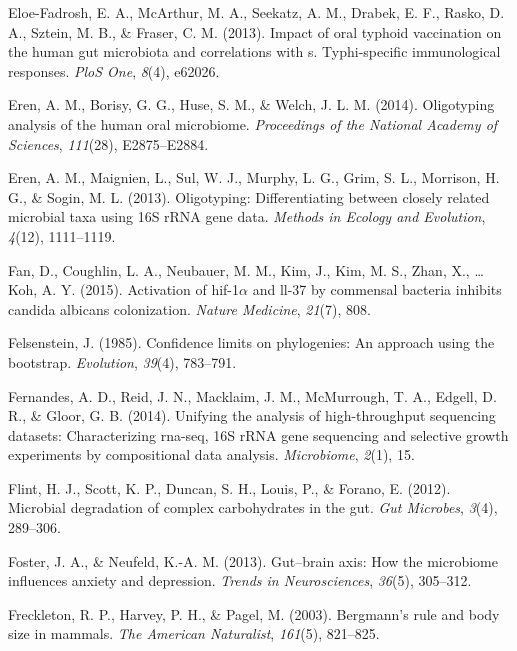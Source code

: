 \documentclass[12pt,a4paper]{reedthesis}
\theoremstyle{definition}
\theoremstyle{definition}
\theoremstyle{definition}
\theoremstyle{remark}
\begin{document}
\leavevmode\hypertarget{ref-eloe2013impact}{}%
Eloe-Fadrosh, E. A., McArthur, M. A., Seekatz, A. M., Drabek, E. F., Rasko, D. A., Sztein, M. B., \& Fraser, C. M. (2013). Impact of oral typhoid vaccination on the human gut microbiota and correlations with s. Typhi-specific immunological responses. \emph{PloS One}, \emph{8}(4), e62026.

\leavevmode\hypertarget{ref-eren2014oligotyping}{}%
Eren, A. M., Borisy, G. G., Huse, S. M., \& Welch, J. L. M. (2014). Oligotyping analysis of the human oral microbiome. \emph{Proceedings of the National Academy of Sciences}, \emph{111}(28), E2875--E2884.

\leavevmode\hypertarget{ref-eren2013oligotyping}{}%
Eren, A. M., Maignien, L., Sul, W. J., Murphy, L. G., Grim, S. L., Morrison, H. G., \& Sogin, M. L. (2013). Oligotyping: Differentiating between closely related microbial taxa using 16S rRNA gene data. \emph{Methods in Ecology and Evolution}, \emph{4}(12), 1111--1119.

\leavevmode\hypertarget{ref-fan2015activation}{}%
Fan, D., Coughlin, L. A., Neubauer, M. M., Kim, J., Kim, M. S., Zhan, X., \ldots{} Koh, A. Y. (2015). Activation of hif-1\(\alpha\) and ll-37 by commensal bacteria inhibits candida albicans colonization. \emph{Nature Medicine}, \emph{21}(7), 808.

\leavevmode\hypertarget{ref-felsenstein1985confidence}{}%
Felsenstein, J. (1985). Confidence limits on phylogenies: An approach using the bootstrap. \emph{Evolution}, \emph{39}(4), 783--791.

\leavevmode\hypertarget{ref-fernandes2014unifying}{}%
Fernandes, A. D., Reid, J. N., Macklaim, J. M., McMurrough, T. A., Edgell, D. R., \& Gloor, G. B. (2014). Unifying the analysis of high-throughput sequencing datasets: Characterizing rna-seq, 16S rRNA gene sequencing and selective growth experiments by compositional data analysis. \emph{Microbiome}, \emph{2}(1), 15.

\leavevmode\hypertarget{ref-flint2012microbial}{}%
Flint, H. J., Scott, K. P., Duncan, S. H., Louis, P., \& Forano, E. (2012). Microbial degradation of complex carbohydrates in the gut. \emph{Gut Microbes}, \emph{3}(4), 289--306.

\leavevmode\hypertarget{ref-foster2013gut}{}%
Foster, J. A., \& Neufeld, K.-A. M. (2013). Gut--brain axis: How the microbiome influences anxiety and depression. \emph{Trends in Neurosciences}, \emph{36}(5), 305--312.

\leavevmode\hypertarget{ref-freckleton2003bergmann}{}%
Freckleton, R. P., Harvey, P. H., \& Pagel, M. (2003). Bergmann's rule and body size in mammals. \emph{The American Naturalist}, \emph{161}(5), 821--825.
\end{document}
